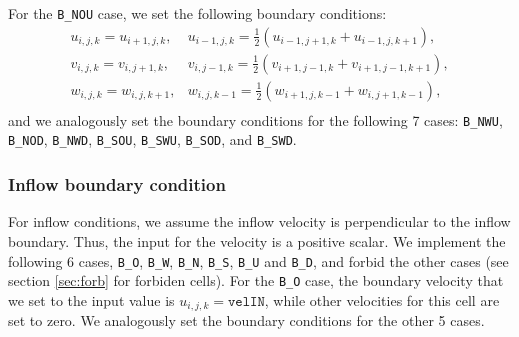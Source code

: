 \documentclass[a4paper, 12pt]{article}
\begin{document}
For the \texttt{B\_NOU} case, we set the following boundary conditions:
\begin{equation}
\begin{array}{ll}
u_{i,j,k} = u_{i+1,j,k}, & u_{i-1,j,k} = \frac{1}{2}(u_{i-1,j+1,k}+u_{i-1,j,k+1}), \\
v_{i,j,k} = v_{i,j+1,k}, & v_{i,j-1,k} = \frac{1}{2}(v_{i+1,j-1,k}+v_{i+1,j-1,k+1}), \\
w_{i,j,k} = w_{i,j,k+1}, & w_{i,j,k-1} = \frac{1}{2}(w_{i+1,j,k-1}+w_{i,j+1,k-1}), \\
\end{array}
\end{equation}
and we analogously set the boundary conditions for the following 7 cases: \texttt{B\_NWU}, \texttt{B\_NOD}, \texttt{B\_NWD}, \texttt{B\_SOU}, \texttt{B\_SWU}, \texttt{B\_SOD}, and \texttt{B\_SWD}.

\subsubsection{Inflow boundary condition}\label{sec:inflow}
For inflow conditions, we assume the inflow velocity is perpendicular to the inflow boundary. Thus, the input for the velocity is a positive scalar. 
We implement the following 6 cases, \texttt{B\_O}, \texttt{B\_W}, \texttt{B\_N}, \texttt{B\_S}, \texttt{B\_U} and \texttt{B\_D}, and forbid the other cases (see section \ref{sec:forb} for forbiden cells).
For the \texttt{B\_O} case, the boundary velocity that we set to the input value is $u_{i,j,k} = \texttt{velIN}$, while other velocities for this cell are set to zero. 
 We analogously set the boundary conditions for the other 5 cases.

%
%
\end{document}
